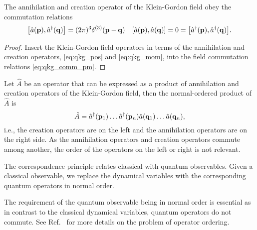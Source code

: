 \begin{theorem}
	The annihilation and creation operator of the Klein-Gordon field obey the commutation relations
	\begin{align}
		\comm{\hat{a}(\vb{p})}{\hat{a}^\dagger(\vb{q})}
		=
		(2\pi)^3\delta^{(3)}(\vb{p}-\vb{q})
		&&
		\comm{\hat{a}(\vb{p})}{\hat{a}(\vb{q})}
		=
		0
		=
		\comm{\hat{a}^\dagger(\vb{p})}{\hat{a}^\dagger(\vb{q})}
		\label{eq:kg_comm_ac}
		.
	\end{align}	
\end{theorem}
\begin{proof}
	Insert the Klein-Gordon field operators in terms of the annihilation and creation operators, \cref{eq:qkg_pos} and \cref{eq:qkg_mom}, into the field commutation relations \cref{eq:qkg_comm_pm}.
\end{proof}

\begin{definition}
	Let $\hat{A}$ be an operator that can be expressed as a product of annihilation and creation operators of the Klein-Gordon field, then the normal-ordered product of $\hat{A}$ is
	\begin{equation}
		\hat{A}
		=
		\hat{a}^\dagger(\vb{p}_1)
		\dots
		\hat{a}^\dagger(\vb{p}_n)
		\hat{a}(\vb{q}_1)
		\dots
		\hat{a}(\vb{q}_n)
		,
	\end{equation}
	i.e., the creation operators are on the left and the annihilation operators are on the right side.
	As the annihilation operators and creation operators commute among another, the order of the operators on the left or right is not relevant.
\end{definition}

\begin{definition}
	The correspondence principle relates classical with quantum observables.
	Given a classical observable, we replace the dynamical variables with the corresponding quantum operators in normal order.
\end{definition}
\begin{remark}
	The requirement of the quantum observable being in normal order is essential as in contrast to the classical dynamical variables, quantum operators do not commute.
	See Ref.~\cite[p.~20]{Mukhanov2007} for more details on the problem of operator ordering.
\end{remark}

